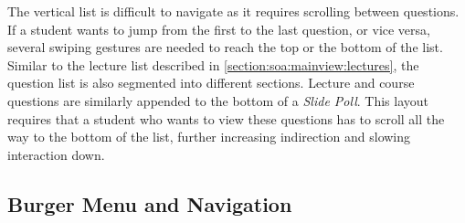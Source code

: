 The vertical list is difficult to navigate as it requires scrolling between questions. If a student wants to jump from the first to the last question,  or vice versa, several swiping gestures are needed to reach the top or the bottom of the list.
Similar to the lecture list described in \autoref{section:soa:mainview:lectures}, the question list is also segmented into different sections. Lecture and course questions are similarly appended to the bottom of a \emph{Slide Poll}. This layout requires that a student who wants to view these questions has to scroll all the way to the bottom of the list, further increasing indirection and slowing interaction down.



\subsection{Burger Menu and Navigation}
\label{section:con:problems:navigation}

